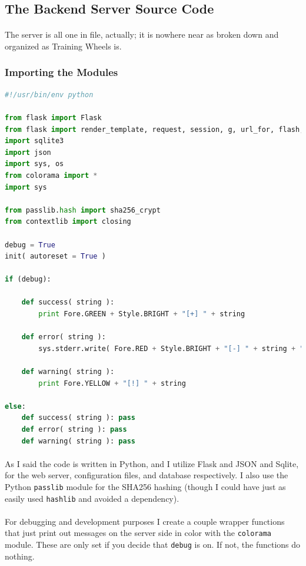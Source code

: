 \documentclass[11pt]{article}
\begin{document}
	\newpage

	\subsection{The Backend Server Source Code}

	\paragraph{} The server is all one in file, actually; it is nowhere near as broken down and organized as Training Wheels is.

	\subsubsection{Importing the Modules}

\begin{lstlisting}[language=Python]
#!/usr/bin/env python

from flask import Flask
from flask import render_template, request, session, g, url_for, flash, get_flashed_messages, redirect
import sqlite3
import json
import sys, os
from colorama import *
import sys

from passlib.hash import sha256_crypt
from contextlib import closing

debug = True
init( autoreset = True )

if (debug):

	def success( string ):
		print Fore.GREEN + Style.BRIGHT + "[+] " + string

	def error( string ):
		sys.stderr.write( Fore.RED + Style.BRIGHT + "[-] " + string + "\n" )

	def warning( string ):
		print Fore.YELLOW + "[!] " + string

else:
	def success( string ): pass
	def error( string ): pass
	def warning( string ): pass
\end{lstlisting}

	\paragraph{} As I said the code is written in Python, and I utilize Flask and JSON and Sqlite, for the web server, configuration files, and database respectively. I also use the Python \texttt{passlib} module for the SHA256 hashing (though I could have just as easily used \texttt{hashlib} and avoided a dependency).

	\paragraph{} For debugging and development purposes I create a couple wrapper functions that just print out messages on the server side in color with the \texttt{colorama} module. These are only set if you decide that \texttt{debug} is on. If not, the functions do nothing.
\end{document}
